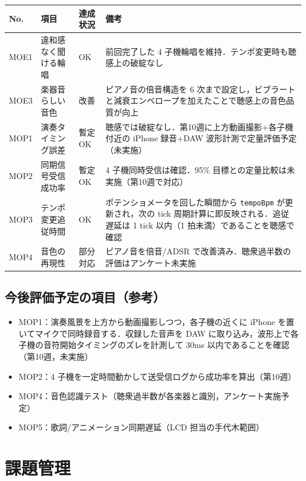 \documentclass[a4paper,11pt]{ltjsarticle}
\providecommand{\％}{\%}
\begin{document}
\begingroup
\setlength{\tabcolsep}{3pt}
\sloppy
\begin{longtable}{|p{1.0cm}|p{2.8cm}|p{1.8cm}|p{8.7cm}|}
\hline
\rowcolor[gray]{0.9}
No. & 項目 & 達成状況 & 備考 \\
\hline
MOE1 & 違和感なく聞ける輪唱 & OK & 前回完了した 4 子機輪唱を維持．テンポ変更時も聴感上の破綻なし \\
\hline
MOE3 & 楽器音らしい音色 & 改善 & ピアノ音の倍音構造を 6 次まで設定し，ビブラートと減衰エンベロープを加えたことで聴感上の音色品質が向上 \\
\hline
MOP1 & 演奏タイミング誤差 & 暫定OK & 聴感では破綻なし．第10週に上方動画撮影+各子機付近の iPhone 録音+DAW 波形計測で定量評価予定（未実施） \\
\hline
MOP2 & 同期信号受信成功率 & 暫定OK & 4 子機同時受信は確認．95\% 目標との定量比較は未実施（第10週で対応） \\
\hline
MOP3 & テンポ変更追従時間 & OK & ポテンショメータを回した瞬間から \texttt{tempoBpm} が更新され，次の tick 周期計算に即反映される．追従遅延は 1 tick 以内（1 拍未満）であることを聴感で確認 \\
\hline
MOP4 & 音色の再現性 & 部分対応 & ピアノ音を倍音/ADSR で改善済み．聴衆過半数の評価はアンケート未実施 \\
\hline
\end{longtable}
\endgroup

\subsection{今後評価予定の項目（参考）}\label{sec:futureplan}

\begin{itemize}
    \item MOP1：演奏風景を上方から動画撮影しつつ，各子機の近くに iPhone を置いてマイクで同時録音する．収録した音声を DAW に取り込み，波形上で各子機の音符開始タイミングのズレを計測して 30ms 以内であることを確認（第10週，未実施）
    \item MOP2：4 子機を一定時間動かして送受信ログから成功率を算出（第10週）
    \item MOP4：音色認識テスト（聴衆過半数が各楽器と識別，アンケート実施予定）
    \item MOP5：歌詞/アニメーション同期遅延（LCD 担当の手代木範囲）
\end{itemize}

\section{課題管理}\label{sec:issues}
\end{document}
